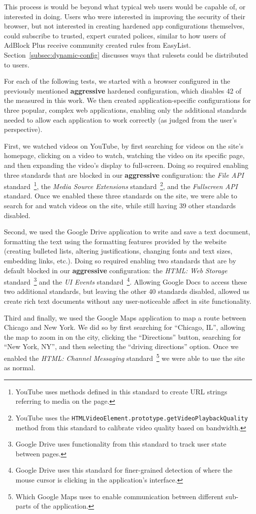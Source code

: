 This process is would be beyond what typical web users would be
capable of, or interested in doing.  Users who were interested in improving the
security of their browser, but not interested in creating hardened app
configurations themselves, could subscribe to trusted, expert curated polices,
similar to how users of AdBlock Plus receive community created rules from
EasyList.  Section~\ref{subsec:dynamic-config} discusses ways that rulesets
could be distributed to users.

For each of the following tests, we started with a browser configured in
the previously mentioned \textbf{aggressive} hardened configuration, 
which disables 42 of the \NumStandards \WASs measured in this work.  We then created
application-specific configurations for three popular, complex web applications,
enabling only the additional standards needed to allow each application
to work correctly (as judged from the user's perspective).

First, we watched videos on YouTube, by first searching for videos on the
site's homepage, clicking on a video to watch, watching the video on its
specific page, and then expanding the video's display to full-screen.
Doing so required enabling three standards that are blocked in our 
\textbf{aggressive} configuration: the \textit{File API} standard~\footnote{YouTube
uses methods defined in this standard to create URL strings referring to media on the
page.}, the \textit{Media Source Extensions} standard~\footnote{YouTube uses the
\texttt{HTMLVideoElement.prototype.getVideoPlaybackQuality} method from this
standard to calibrate video quality based on bandwidth.}, and the
\textit{Fullscreen API} standard. Once we enabled these three standards on the
site, we were able to search for and watch videos on the site, while still
having 39 other standards disabled.

Second, we used the Google Drive application to write and save a text
document, formatting the text using the formatting features provided by
the website (creating bulleted lists, altering justifications, changing
fonts and text sizes, embedding links, etc.).  Doing so required enabling
two standards that are by default blocked in our \textbf{aggressive} configuration:
the \textit{HTML: Web Storage} standard~\footnote{Google Drive uses functionality
from this standard to track user state between pages.} and the \textit{UI Events}
standard~\footnote{Google Drive uses this standard for finer-grained detection
of where the mouse cursor is clicking in the application's interface.}.
Allowing Google Docs to access these two additional standards, but leaving
the other 40 standards disabled, allowed us create rich text documents without
any user-noticeable affect in site functionality.

Third and finally, we used the Google Maps application to map a route between
Chicago and New York.  We did so by first searching for ``Chicago, IL'',
allowing the map to zoom in on the city, clicking the ``Directions'' button,
searching for ``New York, NY'', and then selecting the ``driving directions''
option.  Once we enabled the \textit{HTML: Channel Messaging}
standard~\footnote{Which Google Maps uses to enable communication between different
sub-parts of the application.} we were able to use the site as normal.

